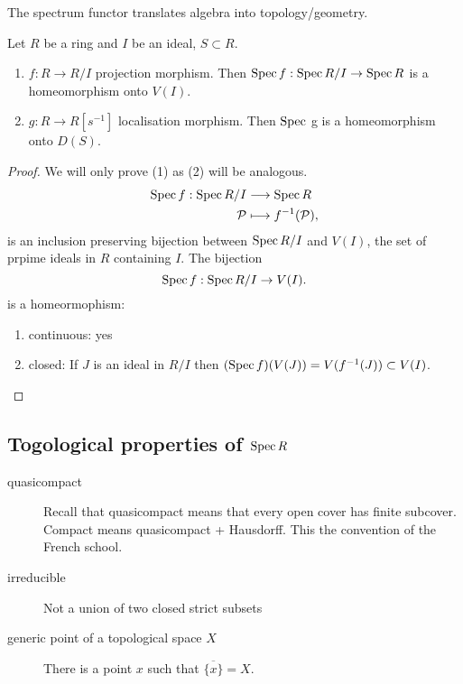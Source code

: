 The spectrum functor translates algebra into topology/geometry.
\begin{proposition}
	Let $R$ be a ring and $I$ be an ideal, $S \subset R$. 
	\begin{enumerate}
		\item $f:R \to R / I$ projection morphism. 
			Then $\operatorname{Spec} f: \operatorname{Spec} R / I \to \operatorname{Spec} R$ is a homeomorphism onto $V(I)$. 
		\item $g: R \to R[s^{-1}]$ localisation morphism. 
			Then $\operatorname{Spec}$ g is a homeomorphism onto $D(S)$. 
	\end{enumerate}
\end{proposition}
\begin{proof}
	We will only prove (1) as  (2) will be analogous.
	\begin{align*}
		\operatorname{Spec} f: \operatorname{Spec} R /I  &\longrightarrow \operatorname{Spec} R \\
		\mathcal{P}  &\longmapsto f^{-1}(\mathcal{P} )
	,\end{align*}
	is an inclusion preserving bijection between $\operatorname{Spec} R / I$ and $V(I)$, the set of prpime ideals in $R$ containing $I$. 
	The bijection \[
		\operatorname{Spec} f: \operatorname{Spec} R / I \to V(I)
	.\] 
	is a homeormophism:
	\begin{enumerate}
		\item continuous: yes
		\item closed: If $J$ is an ideal in $R / I$ then $(\operatorname{Spec} f)(V(J)) =  V(f^{-1}(J)) \subset  V(I)$. 
	\end{enumerate}
\end{proof}

\subsection{Togological properties of $\operatorname{Spec} R$} \label{sec:togological_properties_of_spec_r}
\begin{recall}
	\begin{description}
	
	\item [quasicompact]	Recall that quasicompact means that every open cover has finite subcover. 
	Compact means quasicompact + Hausdorff. This the convention of the French school. 

\item [irreducible] Not a union of two closed strict subsets
\item [generic point of a topological space $X$ ] There is a point $x$ such that $\overline{\{x\} } = X$. 
\end{description}
\end{recall}

